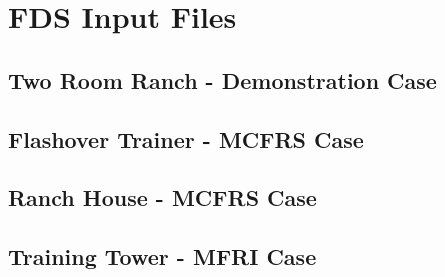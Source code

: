 \documentclass[11pt]{book}
\newcommand{\fdsinput}[1]{
{
\scriptsize

}
}
\begin{document}


\appendix

\chapter{FDS Input Files}

\section{Two Room Ranch - Demonstration Case}
\fdsinput{Demonstrations/2Room_Ranch/ranch_00.fds}

\section{Flashover Trainer - MCFRS Case}
\fdsinput{MCFRS/MCFRS_Flashover/MCFRS_Flashover_00.fds}

\section{Ranch House - MCFRS Case}
\fdsinput{MCFRS/MCFRS_Ranch/MCFRS_Ranch_00.fds}

\section{Training Tower - MFRI Case}
\fdsinput{MFRI/MFRI_Training_Tower/MFRI_Training_Tower_00.fds}
\end{document}
